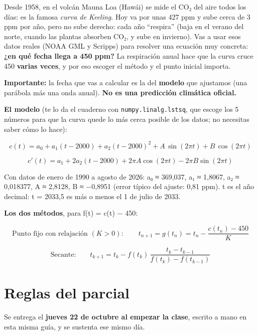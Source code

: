 
\newcommand{\docpie}{Parcial 1 · Raíces B · CO₂}

Desde 1958, en el volcán Mauna Loa (Hawái) se mide el CO₂ del aire todos los días: es la famosa \emph{curva de Keeling}. Hoy va por unas 427 ppm y sube cerca de 3 ppm por año, pero no sube derecho: cada año ``respira'' (baja en el verano del norte, cuando las plantas absorben CO₂, y sube en invierno). Vas a usar esos datos reales (NOAA GML y Scripps) para resolver una ecuación muy concreta: \textbf{¿en qué fecha llega a 450 ppm?} La respiración anual hace que la curva cruce 450 \textbf{varias veces}, y por eso escoger el método y el punto inicial importa.

\textbf{Importante:} la fecha que vas a calcular es la del \textbf{modelo} que ajustamos (una parábola más una onda anual). \textbf{No es una predicción climática oficial.}

\textbf{El modelo} (te lo da el cuaderno con \texttt{numpy.linalg.lstsq}, que escoge los 5 números para que la curva quede lo más cerca posible de los datos; no necesitas saber cómo lo hace):

\[c(t) = a_0 + a_1 (t-2000) + a_2 (t-2000)^2 + A\,\sin(2\pi t) + B\,\cos(2\pi t)\]

\[c'(t) = a_1 + 2a_2 (t-2000) + 2\pi A\cos(2\pi t) - 2\pi B\sin(2\pi t)\]

Con datos de enero de 1990 a agosto de 2026: a₀ ≈ 369,037, a₁ ≈ 1,8067, a₂ ≈ 0,018377, A ≈ 2,8128, B ≈ −0,8951 (error típico del ajuste: 0,81 ppm). t es el año decimal: t = 2033,5 es más o menos el 1 de julio de 2033.

\textbf{Los dos métodos}, para f(t) = c(t) − 450:

\[\text{Punto fijo con relajación } (K>0):\qquad t_{n+1} = g(t_n) = t_n - \frac{c(t_n)-450}{K}\]

\[\text{Secante:}\qquad t_{k+1} = t_k - f(t_k)\,\frac{t_k - t_{k-1}}{f(t_k) - f(t_{k-1})}\]

\section{Reglas del parcial}

Se entrega el \textbf{jueves 22 de octubre al empezar la clase}, escrito a mano en esta misma guía, y se sustenta ese mismo día.

